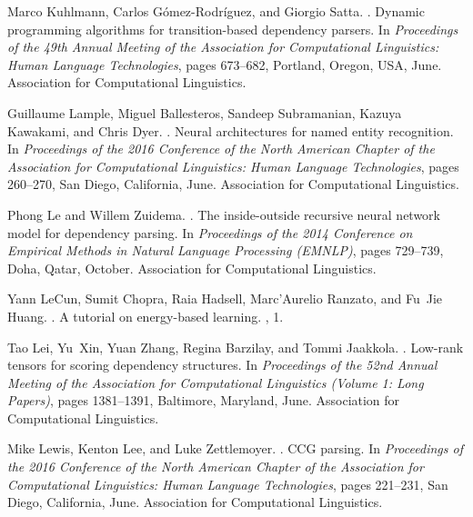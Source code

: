 \documentclass[11pt]{article}
\begin{document}
\begin{thebibliography}{}
Marco Kuhlmann, Carlos G\'{o}mez-Rodr\'{i}guez, and Giorgio Satta.
.
\newblock Dynamic programming algorithms for transition-based dependency
  parsers.
\newblock In {\em Proceedings of the 49th Annual Meeting of the Association for
  Computational Linguistics: Human Language Technologies}, pages 673--682,
  Portland, Oregon, USA, June. Association for Computational Linguistics.

Guillaume Lample, Miguel Ballesteros, Sandeep Subramanian, Kazuya Kawakami, and
  Chris Dyer.
.
\newblock Neural architectures for named entity recognition.
\newblock In {\em Proceedings of the 2016 Conference of the North American
  Chapter of the Association for Computational Linguistics: Human Language
  Technologies}, pages 260--270, San Diego, California, June. Association for
  Computational Linguistics.

Phong Le and Willem Zuidema.
.
\newblock The inside-outside recursive neural network model for dependency
  parsing.
\newblock In {\em Proceedings of the 2014 Conference on Empirical Methods in
  Natural Language Processing (EMNLP)}, pages 729--739, Doha, Qatar, October.
  Association for Computational Linguistics.

Yann LeCun, Sumit Chopra, Raia Hadsell, Marc’Aurelio Ranzato, and Fu~Jie
  Huang.
.
\newblock A tutorial on energy-based learning.
, 1.

Tao Lei, Yu~Xin, Yuan Zhang, Regina Barzilay, and Tommi Jaakkola.
.
\newblock Low-rank tensors for scoring dependency structures.
\newblock In {\em Proceedings of the 52nd Annual Meeting of the Association for
  Computational Linguistics (Volume 1: Long Papers)}, pages 1381--1391,
  Baltimore, Maryland, June. Association for Computational Linguistics.

Mike Lewis, Kenton Lee, and Luke Zettlemoyer.
.
 {CCG} parsing.
\newblock In {\em Proceedings of the 2016 Conference of the North American
  Chapter of the Association for Computational Linguistics: Human Language
  Technologies}, pages 221--231, San Diego, California, June. Association for
  Computational Linguistics.


\end{thebibliography}
\end{document}
